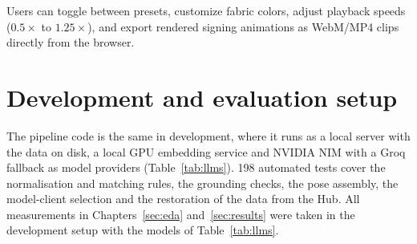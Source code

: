 Users can toggle between presets, customize fabric colors, adjust playback speeds ($0.5\times$ to $1.25\times$), and export rendered signing animations as WebM/MP4 clips directly from the browser.

\section{Development and evaluation setup}
The pipeline code is the same in development, where it runs as a local server with the data on disk, a local GPU
embedding service and NVIDIA NIM with a Groq fallback as model providers (Table~\ref{tab:llms}). 198 automated tests cover
the normalisation and matching rules, the grounding checks, the pose assembly, the model-client selection and the
restoration of the data from the Hub. All measurements in Chapters~\ref{sec:eda} and~\ref{sec:results} were taken in the
development setup with the models of Table~\ref{tab:llms}.
